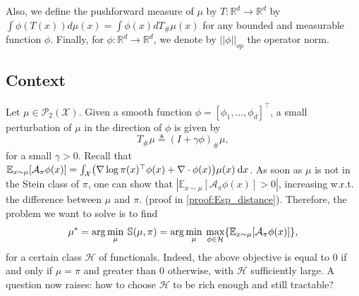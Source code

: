 \documentclass{article}
\newcommand{\R}{\mathbb{R}}
\newcommand{\E}{\mathbb{E}}
\renewcommand{\S}{\mathbb{S}}
\newcommand{\X}{\mathcal{X}}
\newcommand{\A}{\mathcal{A}}
\renewcommand{\P}{\mathcal{P}}
\renewcommand{\H}{\mathcal{H}}
\renewcommand{\S}{\mathbb{S}}
\renewcommand{\d}{\: \mathrm{d}}
\DeclarePairedDelimiter{\pare}{(}{)}
\DeclarePairedDelimiter{\bra}{\{}{\}}
\begin{document}
Also, we define the pushforward measure of $\mu$ by $T:\R^d \longrightarrow \R^d$ by $\int \phi(T(x)) d\mu(x) = \int \phi(x) dT_\#\mu(x)$ for any bounded and measurable function $\phi$. \newline
Finally, for $\phi : \R^d \longrightarrow \R^d$, we denote by $||\phi||_{op}$ the operator norm. \newline

\subsection{Context}
Let $\mu \in \P_2(\X)$. Given a smooth function $\phi = [\phi_1,...,\phi_d]^\top$, a small perturbation of $\mu$ in the direction of $\phi$ is given by 
\begin{equation}
    T_\#\mu \triangleq (I+\gamma \phi)_\#\mu,
\end{equation}
for a small $\gamma > 0$. \newline
Recall that $\E_{x \sim \mu}[\A_\pi \phi (x)] = \int_\X \pare*{ \nabla \log \pi(x)^\top \phi(x) + \nabla \cdot \phi(x) } \mu(x) \d x$. 
As soon as $\mu$ is not in the Stein class of $\pi$, one can show that $\left | \E_{x \sim \mu}[\A_\pi \phi (x)] > 0 \right |$, increasing w.r.t. the difference between $\mu$ and $\pi$. (proof in \ref{proof:Esp_distance}). \newline
Therefore, the problem we want to solve is to find
\begin{equation}
  \mu^* = \arg\min_{\mu} \: \S(\mu, \pi) =
    \arg\min_{\mu} \: \max_{\phi \in \H} \bra*{ \E_{x \sim \mu}[\A_\pi \phi (x)] },
  \label{eq:stein_obj}
\end{equation}
for a certain class $\H$ of functionals.
Indeed, the above objective is equal to $0$ if and only if $\mu = \pi$ and greater than $0$ otherwise,
with $\H$ sufficiently large. A question now raises: how to choose $\H$ to be rich enough and
still tractable? \newline
\end{document}

